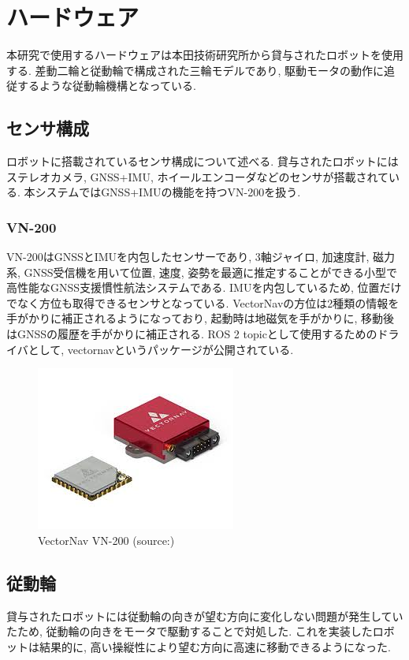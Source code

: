 
\section{ハードウェア}
本研究で使用するハードウェアは本田技術研究所から貸与されたロボットを使用する.
差動二輪と従動輪で構成された三輪モデルであり, 駆動モータの動作に追従するような従動輪機構となっている.

\subsection{センサ構成}
ロボットに搭載されているセンサ構成について述べる.
貸与されたロボットにはステレオカメラ, GNSS+IMU, ホイールエンコーダなどのセンサが搭載されている.
本システムではGNSS+IMUの機能を持つVN-200を扱う.

\subsubsection{VN-200}
VN-200はGNSSとIMUを内包したセンサーであり, 3軸ジャイロ, 加速度計, 磁力系, GNSS受信機を用いて位置, 速度, 姿勢を最適に推定することができる小型で高性能なGNSS支援慣性航法システムである.
IMUを内包しているため, 位置だけでなく方位も取得できるセンサとなっている.
VectorNavの方位は2種類の情報を手がかりに補正されるようになっており, 起動時は地磁気を手がかりに, 移動後はGNSSの履歴を手がかりに補正される.
ROS 2 topicとして使用するためのドライバとして, vectornavというパッケージが公開されている.

\begin{figure}[H]
  \centering
 \includegraphics[keepaspectratio, scale=0.6]
      {images/vn-200.png}
 \caption{VectorNav VN-200 (source:)}
 \label{fig:vn-200 view}
\end{figure}

\subsection{従動輪}
貸与されたロボットには従動輪の向きが望む方向に変化しない問題が発生していたため, 従動輪の向きをモータで駆動することで対処した.
これを実装したロボットは結果的に, 高い操縦性により望む方向に高速に移動できるようになった.

